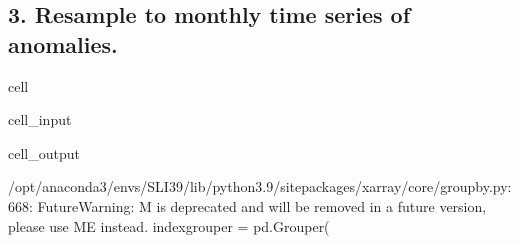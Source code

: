 \documentclass[letterpaper,10pt,english]{jupyterBook}
\begin{document}
\subsection{3. Resample to monthly time series of anomalies.}
\label{\detokenize{notebooks/regional_and_local/SL_anomaly_annual:resample-to-monthly-time-series-of-anomalies}}
\begin{sphinxuseclass}{cell}\begin{sphinxVerbatimInput}

\begin{sphinxuseclass}{cell_input}
\begin{sphinxVerbatim}[commandchars=\\\{\}]
  

  

    

\end{sphinxVerbatim}

\end{sphinxuseclass}\end{sphinxVerbatimInput}
\begin{sphinxVerbatimOutput}

\begin{sphinxuseclass}{cell_output}
\begin{sphinxVerbatim}[commandchars=\\\{\}]
/opt/anaconda3/envs/SLI39/lib/python3.9/site\PYGZhy{}packages/xarray/core/groupby.py:668: FutureWarning: \PYGZsq{}M\PYGZsq{} is deprecated and will be removed in a future version, please use \PYGZsq{}ME\PYGZsq{} instead.
  index\PYGZus{}grouper = pd.Grouper(
\end{sphinxVerbatim}


\end{sphinxuseclass}
\end{sphinxVerbatimOutput}
\end{sphinxuseclass}
\end{document}
